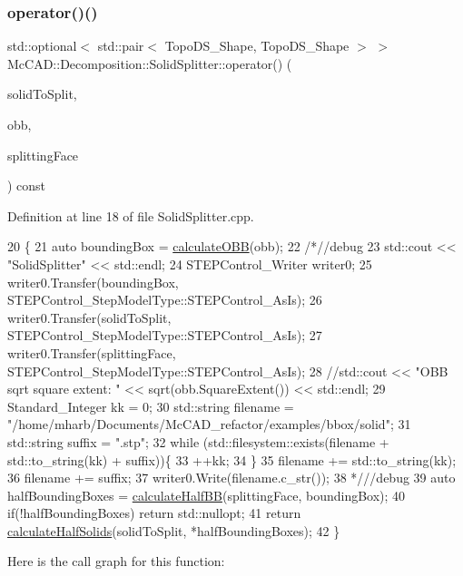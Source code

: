 \subsubsection{\texorpdfstring{operator()()}{operator()()}\hspace{0.1cm}{\footnotesize\ttfamily [2/2]}}
{\footnotesize\ttfamily std\+::optional$<$ std\+::pair$<$ Topo\+D\+S\+\_\+\+Shape, Topo\+D\+S\+\_\+\+Shape $>$ $>$ Mc\+C\+A\+D\+::\+Decomposition\+::\+Solid\+Splitter\+::operator() (\begin{DoxyParamCaption}\item[{const Topo\+D\+S\+\_\+\+Solid \&}]{solid\+To\+Split,  }\item[{const Bnd\+\_\+\+O\+BB \&}]{obb,  }\item[{const Topo\+D\+S\+\_\+\+Face \&}]{splitting\+Face }\end{DoxyParamCaption}) const}



Definition at line 18 of file Solid\+Splitter.\+cpp.


\begin{DoxyCode}
20                                                \{
21     \textcolor{keyword}{auto} boundingBox = \hyperlink{classMcCAD_1_1Decomposition_1_1SolidSplitter_a24c086a0f489167076acfee3bd61d991}{calculateOBB}(obb);
22     \textcolor{comment}{/*//debug}
23 \textcolor{comment}{    std::cout << "SolidSplitter" << std::endl;}
24 \textcolor{comment}{    STEPControl\_Writer writer0;}
25 \textcolor{comment}{    writer0.Transfer(boundingBox, STEPControl\_StepModelType::STEPControl\_AsIs);}
26 \textcolor{comment}{    writer0.Transfer(solidToSplit, STEPControl\_StepModelType::STEPControl\_AsIs);}
27 \textcolor{comment}{    writer0.Transfer(splittingFace, STEPControl\_StepModelType::STEPControl\_AsIs);}
28 \textcolor{comment}{    //std::cout << "OBB sqrt square extent: " << sqrt(obb.SquareExtent()) << std::endl;}
29 \textcolor{comment}{    Standard\_Integer kk = 0;}
30 \textcolor{comment}{    std::string filename = "/home/mharb/Documents/McCAD\_refactor/examples/bbox/solid";}
31 \textcolor{comment}{    std::string suffix = ".stp";}
32 \textcolor{comment}{    while (std::filesystem::exists(filename + std::to\_string(kk) + suffix))\{}
33 \textcolor{comment}{        ++kk;}
34 \textcolor{comment}{    \}}
35 \textcolor{comment}{    filename += std::to\_string(kk);}
36 \textcolor{comment}{    filename += suffix;}
37 \textcolor{comment}{    writer0.Write(filename.c\_str());}
38 \textcolor{comment}{    */}\textcolor{comment}{//debug}
39     \textcolor{keyword}{auto} halfBoundingBoxes = \hyperlink{classMcCAD_1_1Decomposition_1_1SolidSplitter_a39e64be00e1eb2c6d2149c2b7d6cc85b}{calculateHalfBB}(splittingFace, boundingBox);
40     \textcolor{keywordflow}{if}(!halfBoundingBoxes) \textcolor{keywordflow}{return} std::nullopt;
41     \textcolor{keywordflow}{return} \hyperlink{classMcCAD_1_1Decomposition_1_1SolidSplitter_a96441384cc19440a4884adca0bc26be3}{calculateHalfSolids}(solidToSplit, *halfBoundingBoxes);
42 \}
\end{DoxyCode}
Here is the call graph for this function\+:


